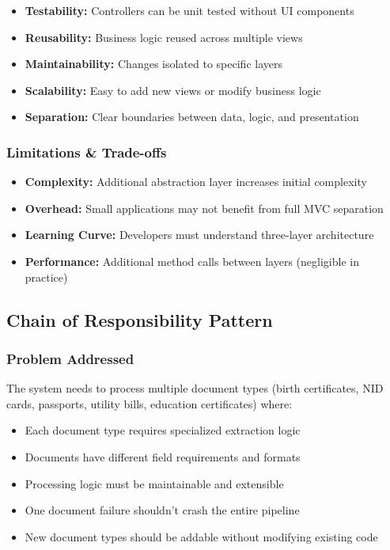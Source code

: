 \documentclass[11pt, a4paper]{article}
\theoremstyle{plain}
\theoremstyle{definition}
\begin{document}
    \begin{itemize}
    \item \textbf{Testability:} Controllers can be unit tested without UI components
    \item \textbf{Reusability:} Business logic reused across multiple views
    \item \textbf{Maintainability:} Changes isolated to specific layers
    \item \textbf{Scalability:} Easy to add new views or modify business logic
    \item \textbf{Separation:} Clear boundaries between data, logic, and presentation
    \end{itemize}

\subsubsection{Limitations \& Trade-offs}

\begin{itemize}
    \item \textbf{Complexity:} Additional abstraction layer increases initial complexity
    \item \textbf{Overhead:} Small applications may not benefit from full MVC separation
    \item \textbf{Learning Curve:} Developers must understand three-layer architecture
    \item \textbf{Performance:} Additional method calls between layers (negligible in practice)
\end{itemize}

\subsection{Chain of Responsibility Pattern}

\subsubsection{Problem Addressed}

The system needs to process multiple document types (birth certificates, NID cards, passports, utility bills, education certificates) where:
\begin{itemize}
    \item Each document type requires specialized extraction logic
    \item Documents have different field requirements and formats
    \item Processing logic must be maintainable and extensible
    \item One document failure shouldn't crash the entire pipeline
    \item New document types should be addable without modifying existing code
\end{itemize}
\end{document}
